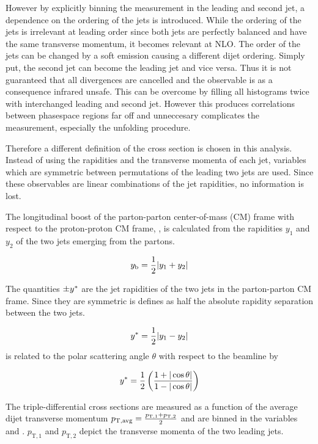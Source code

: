 However by explicitly binning the measurement in the leading and second jet, a
dependence on the ordering of the jets is introduced. While the ordering of the
jets is irrelevant at leading order since both jets are perfectly balanced and
have the same transverse momentum, it becomes relevant at NLO. The order of the
jets can be changed by a soft emission causing a different dijet ordering.
Simply put, the second jet can become the leading jet and vice versa.  Thus it
is not guaranteed that all divergences are cancelled and the observable is as a
consequence infrared unsafe.  This can be overcome by filling all histograms
twice with interchanged leading and second jet. However this produces
correlations between phasespace regions far off and unneccesary complicates the
measurement, especially the unfolding procedure.

Therefore a different definition of the cross section is chosen in this
analysis. Instead of using the rapidities and the transverse momenta of each
jet, variables which are symmetric between permutations of the leading two jets
are used. Since these observables are linear combinations of the jet rapidities,
no information is lost.

The longitudinal boost of the parton-parton center-of-mass (CM) frame with
respect to the proton-proton CM frame, \yboost, is calculated from the
rapidities $y_1$ and $y_2$ of the two jets emerging from the partons. 

\begin{equation*}
    y_{\mathrm{b}} = \frac{1}{2} |y_1 + y_2|
\end{equation*}

The quantities $\pm y^*$ are the jet rapidities of the two jets in the
parton-parton CM frame. Since they are symmetric \ystar is defines as half the
absolute rapidity separation between the two jets.

\begin{equation*}
    y^* = \frac{1}{2} |y_1 - y_2|
\end{equation*}
\ystar is related to the polar scattering angle $\theta$ with respect to the
beamline by 

\begin{equation*}
    y^* = \frac{1}{2} \left( \frac{1 + |\cos \theta|}{1- | \cos \theta|}
    \right)
\end{equation*}

The triple-differential cross sections are measured as a function of the average dijet
transverse momentum $p_{\mathrm{T,avg}} = \frac{p_{\mathrm{T},1} + p_{\mathrm{T},2}}{2}$ and
are binned in the variables \ystar and \yboost. $p_{\mathrm{T},1}$ and
$p_{\mathrm{T},2}$ depict the transverse momenta of the two leading jets. 

